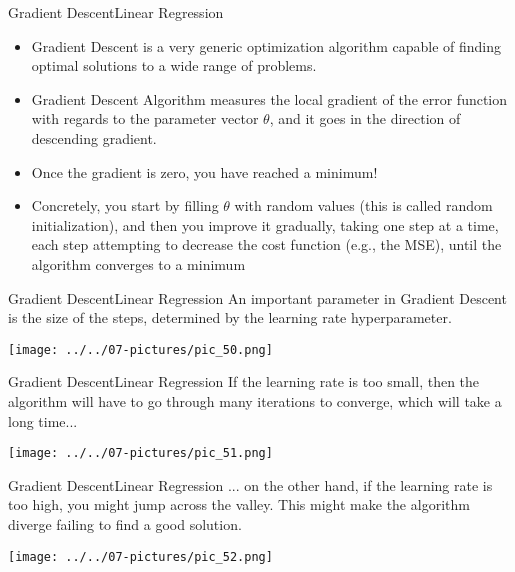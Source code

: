 \documentclass[11pt]{beamer}
\begin{document}
%
\begin{frame}{Gradient Descent}{Linear Regression}
   \begin{itemize}
      \item   				  						  
		Gradient Descent is a very generic optimization algorithm capable of finding optimal solutions to a wide range of problems. 
	  \item Gradient Descent Algorithm measures the local gradient of the error function with regards to the parameter vector $\theta$, and it goes in the direction of descending gradient. 
	  \item Once the gradient is zero, you have reached a minimum!
      \item Concretely, you start by filling $\theta$ with random values (this is called random initialization), and then you improve it gradually, taking one step at a time, each step attempting to decrease the cost function (e.g., the MSE), until the algorithm converges to a minimum		  
   \end{itemize}
\end{frame}
\begin{frame}{Gradient Descent}{Linear Regression}
An important parameter in Gradient Descent is the size of the steps, determined by
the learning rate hyperparameter. 
   \begin{center}
   \texttt{[image: ../../07-pictures/pic\_50.png]} 	
   \end{center}
\end{frame}
\begin{frame}{Gradient Descent}{Linear Regression}
If the learning rate is too small, then the algorithm
will have to go through many iterations to converge, which will take a long time...   \begin{center}
   \texttt{[image: ../../07-pictures/pic\_51.png]} 	
   \end{center}
\end{frame}
\begin{frame}{Gradient Descent}{Linear Regression}
... on the other hand, if the learning rate is too high, you might jump across the valley. This might make the algorithm diverge failing to find a good solution. 
   \begin{center}
   \texttt{[image: ../../07-pictures/pic\_52.png]} 	
   \end{center}
\end{frame}
\end{document}
